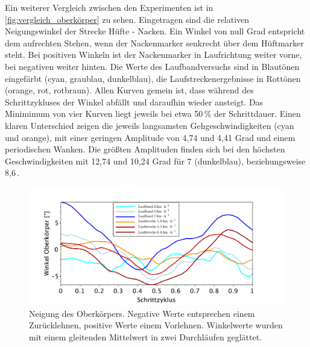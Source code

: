 Ein weiterer Vergleich zwischen den Experimenten ist in \autoref{fig:vergleich_oberkörper} zu sehen. Eingetragen sind die relativen Neigungswinkel der Strecke Hüfte - Nacken. Ein Winkel von null Grad entspricht dem aufrechten Stehen, wenn der Nackenmarker senkrecht über dem Hüftmarker steht. Bei positiven Winkeln ist der Nackenmarker in Laufrichtung weiter vorne, bei negativen weiter hinten. Die Werte des Laufbandversuchs sind in Blautönen eingefärbt (cyan, graublau, dunkelblau), die Laufstreckenergebnisse in Rottönen (orange, rot, rotbraun). Allen Kurven gemein ist, dass während des Schrittzykluses der Winkel abfällt und daraufhin wieder ansteigt. Das Minimimum von vier Kurven liegt jeweils bei etwa 50\,\% der Schrittdauer. Einen klaren Unterschied zeigen die jeweils langsamsten Gehgeschwindigkeiten (cyan und orange), mit einer geringen Amplitude von 4,74 und 4,41 Grad und einem periodischen Wanken. Die größten Amplituden finden sich bei den höchsten Geschwindigkeiten mit 12,74 und 10,24 Grad für 7 (dunkelblau), beziehungsweise 8,6\,\kmh.

\begin{figure}[h!]
	\centering
	\includegraphics[width=1\linewidth]{bilder/ergebnisse/back_angle.pdf}
	\caption[Bodenreaktionskräfte]{Neigung des Oberkörpers. Negative Werte entsprechen einem Zurücklehnen, positive Werte einem Vorlehnen. Winkelwerte wurden mit einem gleitenden Mittelwert in zwei Durchläufen geglättet.}
	\label{fig:vergleich_oberkörper}
\end{figure}
